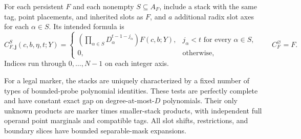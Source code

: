 For each persistent $F$ and each nonempty $S\subseteq A_F$, include
a stack with the same tag, point placements, and inherited slots as
$F$, and $a$ additional radix slot axes for each $\alpha\in S$.
Its intended formula is
\begin{equation}
 C^S_{F,\mathbf j}(c,b,\eta,t;Y)=
 \begin{cases}
 \displaystyle\left(\prod_{\alpha\in S}
           D_\alpha^{t-1-j_\alpha}\right)F(c,b;Y),
             &j_\alpha<t\text{ for every }\alpha\in S,\\[2pt]
 0,           &\text{otherwise},
 \end{cases}
 \qquad C_F^\varnothing=F.                         \label{ia:stack-formula}
\end{equation}
Indices run through $0,\ldots,N-1$ on each integer axis.

\begin{lemma}\label{ia:stacks}
For a legal marker, the stacks are uniquely characterized by a fixed
number of types of bounded-probe polynomial identities.  These tests
are perfectly complete and have constant exact gap on
degree-at-most-$D$ polynomials.  Their only unknown products are
marker times smaller-stack products, with independent full operand
point marginals and compatible tags.  All slot shifts, restrictions,
and boundary slices have bounded separable-mask expansions.
\end{lemma}

